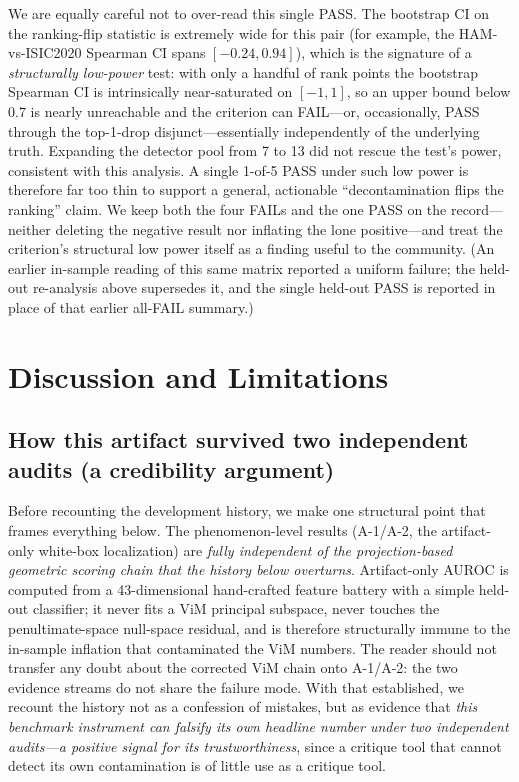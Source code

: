 \documentclass{article}
\begin{document}
We are equally careful not to over-read this single PASS. The bootstrap CI on the
ranking-flip statistic is extremely wide for this pair (for example, the
HAM-vs-ISIC2020 Spearman CI spans $[-0.24, 0.94]$), which is the signature of a
\emph{structurally low-power} test: with only a handful of rank points the
bootstrap Spearman CI is intrinsically near-saturated on $[-1, 1]$, so an upper
bound below $0.7$ is nearly unreachable and the criterion can FAIL---or,
occasionally, PASS through the top-1-drop disjunct---essentially independently of
the underlying truth. Expanding the detector pool from 7 to 13 did not rescue the
test's power, consistent with this analysis. A single 1-of-5 PASS under such low
power is therefore far too thin to support a general, actionable ``decontamination
flips the ranking'' claim. We keep both the four FAILs and the one PASS on the
record---neither deleting the negative result nor inflating the lone
positive---and treat the criterion's structural low power itself as a finding
useful to the community. (An earlier in-sample reading of this same matrix
reported a uniform failure; the held-out re-analysis above supersedes it, and the
single held-out PASS is reported in place of that earlier all-FAIL summary.)

\section{Discussion and Limitations}

\subsection{How this artifact survived two independent audits (a credibility
argument)}

Before recounting the development history, we make one structural point that
frames everything below. The phenomenon-level results (A-1/A-2, the artifact-only
white-box localization) are \emph{fully independent of the projection-based
geometric scoring chain that the history below overturns}. Artifact-only AUROC is
computed from a 43-dimensional hand-crafted feature battery with a simple
held-out classifier; it never fits a ViM principal subspace, never touches the
penultimate-space null-space residual, and is therefore structurally immune to
the in-sample inflation that contaminated the ViM numbers. The reader should not
transfer any doubt about the corrected ViM chain onto A-1/A-2: the two evidence
streams do not share the failure mode. With that established, we recount the
history not as a confession of mistakes, but as evidence that \emph{this
benchmark instrument can falsify its own headline number under two independent
audits---a positive signal for its trustworthiness}, since a critique tool that
cannot detect its own contamination is of little use as a critique tool.
\end{document}
